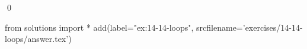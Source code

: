 
\begin{ex}
  \label{ex:14-14-loops}
  
  \qed
\end{ex}
\begin{python0}
from solutions import *
add(label="ex:14-14-loops",
    srcfilename='exercises/14-14-loops/answer.tex')
\end{python0}
